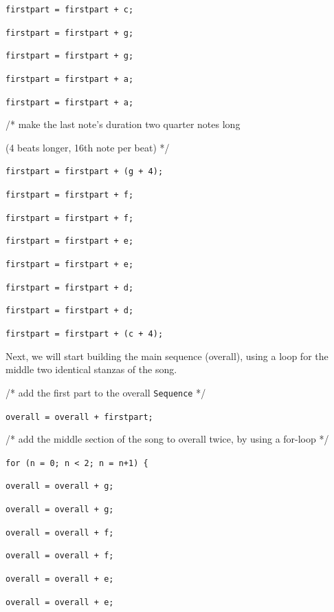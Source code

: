 \documentclass[12pt,A4]{book}
\begin{document}
	\verb|firstpart = firstpart + c;|
	
	\verb|firstpart = firstpart + g;|
	
	\verb|firstpart = firstpart + g;|
	
	\verb|firstpart = firstpart + a;|
	
	\verb|firstpart = firstpart + a;|
	
	/* make the last note's duration two quarter notes long 
	
	(4 beats longer, 16th note per beat) */
	
	\verb|firstpart = firstpart + (g + 4);|
	
	\vspace{3 mm}
		
	\verb|firstpart = firstpart + f;|
	
	\verb|firstpart = firstpart + f;|
	
	\verb|firstpart = firstpart + e;|
	
	\verb|firstpart = firstpart + e;|
	
	\verb|firstpart = firstpart + d;|
	
	\verb|firstpart = firstpart + d;|
	
	\verb|firstpart = firstpart + (c + 4);|
	
\vspace{5 mm}

\noindent Next, we will start building the main sequence (overall), using a loop 
for the middle two identical stanzas of the song.

\vspace{5 mm}

	/* add the first part to the overall \verb|Sequence| */
	
	\verb|overall = overall + firstpart;|
	
	\vspace{3 mm}
	
	/* add the middle section of the song to overall twice, 
by using a for-loop */

	
	\verb|for (n = 0; n < 2; n = n+1) {|
	
		\indent \verb|overall = overall + g;|
	
		\indent \verb|overall = overall + g;|
	
		\indent \verb|overall = overall + f;|
	
		\indent \verb|overall = overall + f;|
	
		\indent \verb|overall = overall + e;|
	
		\indent \verb|overall = overall + e;|
	
\end{document}
